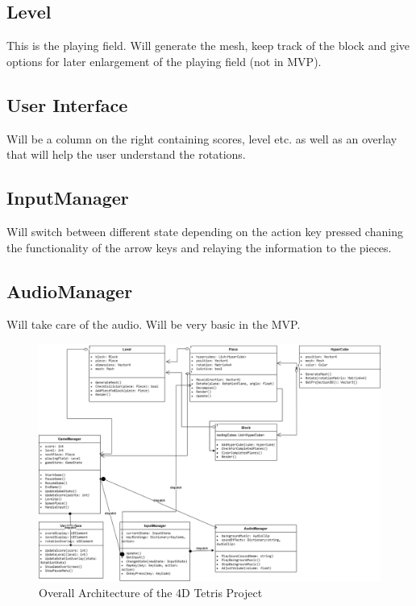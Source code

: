\documentclass{article}
\begin{document}
\subsection{Level}
This is the playing field. Will generate the mesh, keep track of the block and give options for later enlargement of the playing field (not in MVP).
\subsection{User Interface}
Will be a column on the right containing scores, level etc. as well as an overlay that will help the user understand the rotations.
\subsection{InputManager}
Will switch between different state depending on the action key pressed chaning the functionality of the arrow keys and relaying the information to the pieces.
\subsection{AudioManager}
Will take care of the audio. Will be very basic in the MVP.


\begin{figure}[H]
    \centering
    \includegraphics[width=\textwidth]{classes.png}
    \caption{Overall Architecture of the 4D Tetris Project}
    \label{fig:architecture}
\end{figure}
\end{document}
